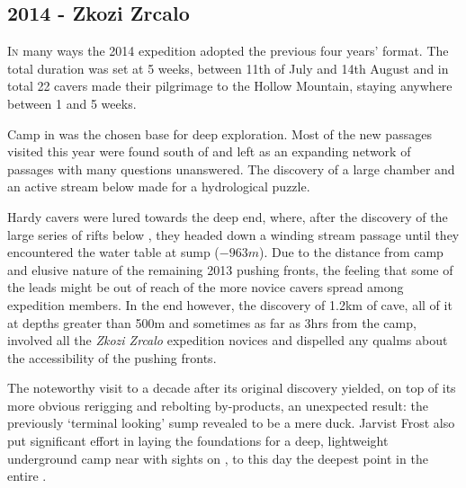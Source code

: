 \newpage
\begin{tcolorbox}

\chapter{2014 - Zkozi Zrcalo}
		\lettrine{I}{n} many ways the 2014 expedition adopted the previous four years' format. The total duration was set at 5 weeks, between 11th of July and 14th August and in total 22 cavers made their pilgrimage to the Hollow Mountain, staying anywhere between 1 and 5 weeks.

Camp  in  was the chosen base for deep exploration. Most of the new passages visited this year were found south of  and left as an expanding network of passages with many questions unanswered. The discovery of a large chamber and an active stream below made for a hydrological puzzle.

		Hardy cavers were lured towards the deep end, where, after the discovery of the large series of rifts below , they headed down a winding stream passage until they encountered the water table at  sump ($-963m$).  Due to the distance from camp and elusive nature of the remaining 2013 pushing fronts, the feeling that some of the leads might be out of reach of the more novice cavers spread among expedition members. In the end however, the discovery of 1.2km of cave, all of it at depths greater than 500m and sometimes as far as 3hrs from the camp, involved all the \emph{Zkozi Zrcalo} expedition novices and dispelled any qualms about the accessibility of the pushing fronts.

 		The noteworthy visit to  a decade after its original discovery yielded, on top of its more obvious rerigging and rebolting by-products, an unexpected result: the previously `terminal looking' sump revealed to be a mere duck. Jarvist Frost also put significant effort in laying the foundations for a deep, lightweight underground camp near  with sights on , to this day the deepest point in the entire .
		
\end{tcolorbox}
